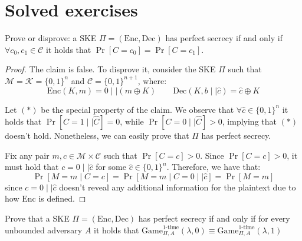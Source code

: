 \documentclass[a4paper, 12pt]{report}
\begin{document}
    \section{Solved exercises}

    \begin{framedprob}{}
        Prove or disprove: a SKE $\Pi = (\mathrm{Enc}, \mathrm{Dec})$ has perfect secrecy if and only if $\forall c_0, c_1 \in \mathcal{C}$ it holds that $\Pr[C = c_0] = \Pr[C = c_1]$.
    \end{framedprob}

    \begin{proof}
        The claim is false. To disprove it, consider the SKE $\Pi$ such that $\mathcal{M} = \mathcal{K} = \{0,1\}^n$ and $\mathcal{C} = \{0,1\}^{n+1}$, where:
        \[\mathrm{Enc}(K, m) = 0 \mid\mid (m \oplus K) \qquad \mathrm{Dec}(K, b \mid\mid \widehat c) = \widehat c \oplus K\]

        Let $(*)$ be the special property of the claim. We observe that $\forall \widehat c \in \{0,1\}^n$ it holds that $\Pr[C = 1 \mid\mid \widehat C] = 0$, while $\Pr[C = 0 \mid\mid \widehat C] > 0$, implying that $(*)$ doesn't hold. Nonetheless, we can easily prove that $\Pi$ has perfect secrecy.

        Fix any pair $m, c \in \mathcal{M} \times \mathcal{C}$ such that $\Pr[C = c] > 0$. Since $\Pr[C = c] > 0$, it must hold that $c = 0 \mid\mid \widehat c$ for some $\widehat c \in \{0,1\}^n$. Therefore, we have that:
        \[\Pr[M = m \mid C = c] = \Pr[M = m \mid C = 0 \mid\mid \widehat c] = \Pr[M = m]\]
        since $c = 0 \mid\mid \widehat c$ doesn't reveal any additional information for the plaintext due to how $\mathrm{Enc}$ is defined.
    \end{proof}

    \begin{framedprob}{}
        Prove that a SKE $\Pi = (\mathrm{Enc}, \mathrm{Dec})$ has perfect secrecy if and only if for every unbounded adversary $A$ it holds that $\mathrm{Game}_{\Pi,A}^{\text{1-time}}(\lambda, 0) \equiv \mathrm{Game}_{\Pi,A}^{\text{1-time}}(\lambda, 1)$
    \end{framedprob}
\end{document}

